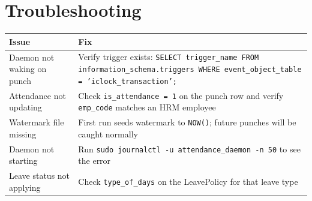 \documentclass[12pt,a4paper]{article}
\begin{document}
\section{Troubleshooting}

\begin{longtable}{p{5cm} p{8.5cm}}
\toprule
\textbf{Issue} & \textbf{Fix} \\
\midrule
\endhead
Daemon not waking on punch
    & Verify trigger exists: \texttt{SELECT trigger\_name FROM
      information\_schema.triggers WHERE event\_object\_table =
      'iclock\_transaction';} \\[6pt]
Attendance not updating
    & Check \texttt{is\_attendance = 1} on the punch row and verify
      \texttt{emp\_code} matches an HRM employee \\[6pt]
Watermark file missing
    & First run seeds watermark to \texttt{NOW()}; future punches
      will be caught normally \\[6pt]
Daemon not starting
    & Run \texttt{sudo journalctl -u attendance\_daemon -n 50} to
      see the error \\[6pt]
Leave status not applying
    & Check \texttt{type\_of\_days} on the LeavePolicy for that
      leave type \\
\bottomrule
\end{longtable}
\end{document}
